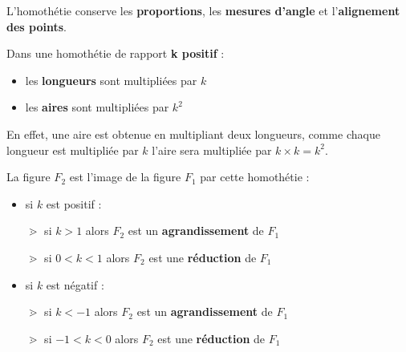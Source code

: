 \begin{propriete}
    L'homothétie conserve les \textbf{proportions}, les \textbf{mesures d'angle} et l'\textbf{alignement des points}. 
\end{propriete}
\begin{propriete}
    Dans une homothétie de rapport \textbf{k positif} : 
    \begin{itemize}
        \item les \textbf{longueurs} sont multipliées par $k$
        \item les \textbf{aires} sont multipliées par $k^2$
    \end{itemize}
\end{propriete}
\begin{preuve}
    En effet, une aire est obtenue en multipliant deux longueurs, comme chaque longueur est multipliée par $k$ l'aire sera multipliée par $k\times k = k^2$.
\end{preuve}    
\begin{propriete}[\admise]
    La figure $F_2$ est l'image de la figure $F_1$ par cette homothétie :
    \begin{itemize}
        \item si $k$ est positif :
        
        \hspace*{1cm}$\gtrdot$ si $k>1$ alors $F_2$ est un \textbf{agrandissement} de $F_1$

        \hspace*{1cm}$\gtrdot$ si $0<k<1$ alors $F_2$ est une \textbf{réduction} de $F_1$
        \item si $k$ est négatif :
        
        \hspace*{1cm}$\gtrdot$ si $k<-1$ alors $F_2$ est un \textbf{agrandissement} de $F_1$

        \hspace*{1cm}$\gtrdot$ si $-1<k<0$ alors $F_2$ est une \textbf{réduction} de $F_1$
    \end{itemize}
\end{propriete}
